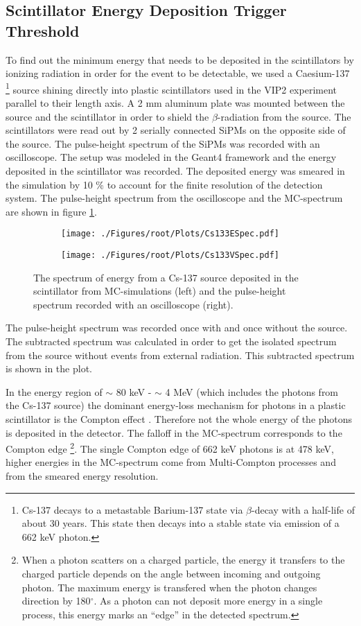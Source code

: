 \subsection{Scintillator Energy Deposition Trigger Threshold}

To find out the minimum energy that needs to be deposited in the scintillators by ionizing radiation in order for the event to be detectable, we used a Caesium-137 \footnote{Cs-137 decays to a metastable Barium-137 state via $\beta$-decay with a half-life of about 30 years. This state then decays into a stable state via emission of a 662 keV photon.} source shining directly into plastic scintillators used in the VIP2 experiment parallel to their length axis. A 2 mm aluminum plate was mounted between the source and the scintillator in order to shield the $\beta$-radiation from the source. The scintillators were read out by 2 serially connected SiPMs on the opposite side of the source. The pulse-height spectrum of the SiPMs was recorded with an oscilloscope. The setup was modeled in the Geant4 framework and the energy deposited in the scintillator was recorded. The deposited energy was smeared in the simulation by 10 \% to account for the finite resolution of the detection system. The pulse-height spectrum from the oscilloscope and the MC-spectrum are shown in figure \ref{fig:scintEnDep}.
\begin{figure}[h]
 \centering
 \begin{subfigure}{.49\textwidth}
 \centering
 \texttt{[image: ./Figures/root/Plots/Cs133ESpec.pdf]}
 \end{subfigure}
 \hfill
 \begin{subfigure}{.49\textwidth}
 \centering
 \texttt{[image: ./Figures/root/Plots/Cs133VSpec.pdf]}
 \end{subfigure}
 \caption{The spectrum of energy from a Cs-137 source deposited in the scintillator from MC-simulations (left) and the pulse-height spectrum recorded with an oscilloscope (right).}
 \label{fig:scintEnDep}
\end{figure}
The pulse-height spectrum was recorded once with and once without the source. The subtracted spectrum was calculated in order to get the isolated spectrum from the source without events from external radiation. This subtracted spectrum is shown in the plot. 

In the energy region of $\sim$ 80 keV - $\sim$ 4 MeV (which includes the photons from the Cs-137 source) the dominant energy-loss mechanism for photons in a plastic scintillator is the Compton effect \cite{Leo1993}. Therefore not the whole energy of the photons is deposited in the detector. The falloff in the MC-spectrum corresponds to the Compton edge \footnote{When a photon scatters on a charged particle, the energy it transfers to the charged particle depends on the angle between incoming and outgoing photon. The maximum energy is transfered when the photon changes direction by 180$^{\circ}$. As a photon can not deposit more energy in a single process, this energy marks an ``edge'' in the detected spectrum.}. The single Compton edge of 662 keV photons is at 478 keV, higher energies in the MC-spectrum come from Multi-Compton processes and from the smeared energy resolution. 

